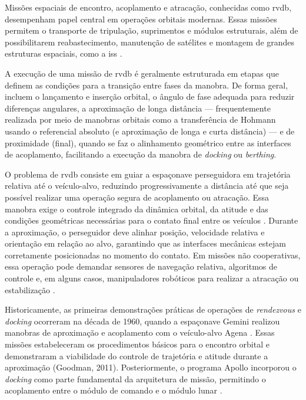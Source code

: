 Missões espaciais de encontro, acoplamento e atracação, conhecidas como \gls{rvdb}, desempenham papel central em operações orbitais modernas.
Essas missões permitem o transporte de tripulação, suprimentos e módulos estruturais, além de possibilitarem reabastecimento, manutenção de satélites e montagem de grandes estruturas espaciais, como a \gls{iss} \cite{nasaISS}.

A execução de uma missão de \gls{rvdb} é geralmente estruturada em etapas que definem as condições para a transição entre fases da manobra.
De forma geral, incluem o lançamento e inserção orbital, o ângulo de fase adequada para reduzir diferenças angulares, a aproximação de longa distância — frequentemente realizada por meio de manobras orbitais como a transferência de Hohmann usando o referencial absoluto (e aproximação de longa e curta distância) — e de proximidade (final), quando se faz o alinhamento geométrico entre as interfaces de acoplamento, facilitando a execução da manobra de \textit{docking} ou \textit{berthing}.

O problema de \gls{rvdb} consiste em guiar a espaçonave perseguidora em trajetória relativa até o veículo-alvo, reduzindo progressivamente a distância até que seja possível realizar uma operação segura de acoplamento ou atracação. Essa manobra exige o controle integrado da dinâmica orbital, da atitude e das condições geométricas necessárias para o contato final entre os veículos \cite{curtis2013orbital}.
Durante a aproximação, o perseguidor deve alinhar posição, velocidade relativa e orientação em relação ao alvo, garantindo que as interfaces mecânicas estejam corretamente posicionadas no momento do contato. Em missões não cooperativas, essa operação pode demandar sensores de navegação relativa, algoritmos de controle e, em alguns casos, manipuladores robóticos para realizar a atracação ou estabilização \cite{flores2014review}.

Historicamente, as primeiras demonstrações práticas de operações de \textit{rendezvous} e \textit{docking} ocorreram na década de 1960, quando a espaçonave Gemini realizou manobras de aproximação e acoplamento com o veículo-alvo Agena \cite{nasa1stDocking}.
Essas missões estabeleceram os procedimentos básicos para o encontro orbital e demonstraram a viabilidade do controle de trajetória e atitude durante a aproximação (Goodman, 2011). Posteriormente, o programa Apollo incorporou o \textit{docking} como parte fundamental da arquitetura de missão, permitindo o acoplamento entre o módulo de comando e o módulo lunar \cite{nevins1971}. 

